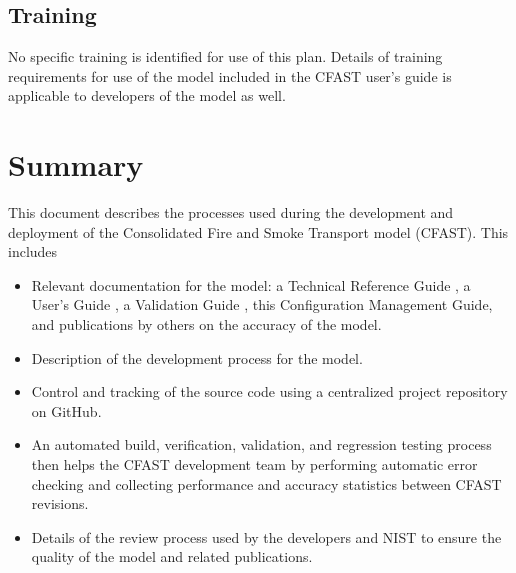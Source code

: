 \documentclass[12pt]{book}
\begin{document}
\section{Training}

No specific training is identified for use of this plan.  Details of training requirements for use of the model included in the CFAST user's guide is applicable to developers of the model as well.

\chapter{Summary}

This document describes the processes used during the development and deployment of the Consolidated Fire and Smoke Transport model (CFAST). This includes

\begin{itemize}
\item Relevant documentation for the model: a Technical Reference Guide \cite{CFAST_Tech_Guide_7}, a User's Guide \cite{CFAST_Users_Guide_7}, a Validation Guide \cite{CFAST_Valid_Guide_7}, this Configuration Management Guide, and publications by others on the accuracy of the model.

\item Description of the development process for the model.

\item Control and tracking of the source code using a centralized project repository on GitHub.

\item An automated build, verification, validation, and regression testing process then helps the CFAST development team by performing automatic error checking and collecting performance and accuracy statistics between CFAST revisions.

\item Details of the review process used by the developers and NIST to ensure the quality of the model and related publications.

\end{itemize}
\end{document}
